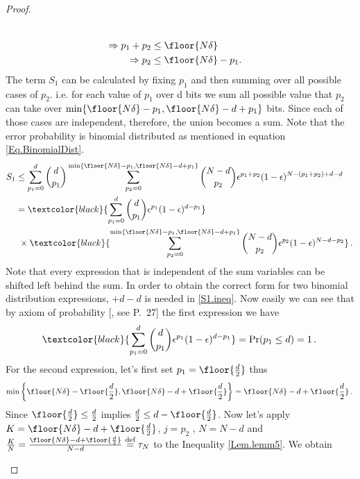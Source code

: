 \begin{proof}
\begin{itemize}
\begin{enumerate}
\begin{align}
    \\
    \Rightarrow p_1+p_2 &\leq \floor{N\delta}
    \\
    \Rightarrow p_2 &\leq \floor{N\delta}-p_1.
\end{align} 
The term $S_1$ can be calculated by fixing $p_1$ and then summing over all possible cases of $p_2$. i.e. for each value of $p_1$ over d bits we sum all possible value that $p_2$ can take over $\min\{\floor{N\delta}-p_1,\floor{N\delta}-d+p_1\}$ bits. Since each of those cases are independent, therefore, the union becomes a sum. Note that the error probability is binomial distributed as mentioned in equation \eqref{Eq.BinomialDist}.
\begin{align}
    \label{S1.ineq}
    S_1 &\leq \sum_{p_1=0}^d \binom{d}{p_1} \sum_{p_2=0}^{\min\left\{\floor{N\delta}-p_1,\floor{N\delta}-d+p_1\right\}} \binom{N-d}{p_2} \epsilon^{p_1+p_2} (1-\epsilon)^{N-\left(p_1+p_2\right)+d-d}
    \nonumber\\
    & = \textcolor{black}{\sum_{p_1=0}^d \binom{d}{p_1} \epsilon^{p_1} (1-\epsilon)^{d-p_1}} 
    \nonumber\\
    & ~ \times \textcolor{black}{\sum_{p_2=0}^{\min\left\{\floor{N\delta}-p_1,\floor{N\delta}-d+p_1\right\}} \binom{N-d}{p_2} \epsilon^{p_2} (1-\epsilon)^{N-d-p_2}}\,.\,
\end{align}
%
Note that every expression that is independent of the sum variables can be  shifted left behind the sum. In order to obtain the correct form for two binomial distribution expressions, $+d-d$ is needed in \eqref{S1.ineq}. Now easily we can see that by axiom of probability [\cite{Ross14}, see P.~27] the first expression we have
%
\begin{align}
    \textcolor{black}{\sum_{p_1=0}^d \binom{d}{p_1} \epsilon^{p_1} (1-\epsilon)^{d-p_1}} = \Pr (p_1\leq d) = 1\,.\,
\end{align}
%
For the second expression, let's first set $p_1= \floor{\frac{d}{2}}$ thus 
\begin{align}
    \min\left\{\floor{N\delta}-\floor{\frac{d}{2}},\floor{N\delta}-d+\floor{\frac{d}{2}}\right\} = \floor{N\delta}-d+\floor{\frac{d}{2}}\,.\,
\end{align}
Since $\floor{\frac{d}{2}} \leq \frac{d}{2}$ implies $\frac{d}{2}\leq d-\floor{\frac{d}{2}}$.\newline
Now let's apply 
$K=\floor{N\delta}-d+\floor{\frac{d}{2}}$, $j=p_2$ , $N=N-d$ and $\frac{K}{N}=\frac{\floor{N\delta}-d+\floor{\frac{d}{2}}}{N-d}\overset{\text{def}}{=}\tau_N $ to the Inequality \eqref{Lem.lemm5}. We obtain 

\end{enumerate}
\end{itemize}
\end{proof}
